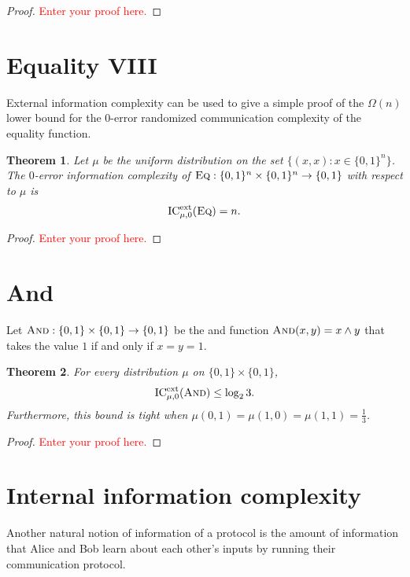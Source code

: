 \documentclass[11pt]{amsart}
\theoremstyle{plain}
\newtheorem{theorem}{Theorem}
\theoremstyle{definition}
\theoremstyle{plain}
\newcommand{\Eq}{\textsc{Eq}}
\newcommand{\ICext}{\mathrm{IC}^{\mathrm{ext}}}
\newcommand{\replacethistext}[1]{\textcolor{red}{#1}}
\begin{document}
\begin{proof}
\replacethistext{Enter your proof here.}
\end{proof}


\newpage 
\section{Equality VIII}

External information complexity can be used to give a simple proof of the $\Omega(n)$ lower bound for the $0$-error randomized communication complexity of the equality function.

\begin{theorem}
Let $\mu$ be the uniform distribution on the set $\{(x,x) : x \in \{0,1\}^n\}$. The $0$-error information complexity of $\Eq : \{0,1\}^n \times \{0,1\}^n \to \{0,1\}$ with respect to $\mu$ is
\[
\ICext_{\mu,0}(\Eq) = n.
\]
\end{theorem}

\begin{proof}
\replacethistext{Enter your proof here.}
\end{proof}

\newpage 
\section{And}

Let $\textsc{And} : \{0,1\} \times \{0,1\} \to \{0,1\}$ be the and function $\textsc{And}(x,y) = x \wedge y$ that takes the value $1$ if and only if $x = y = 1$.

\begin{theorem}
For every distribution $\mu$ on $\{0,1\} \times \{0,1\}$,
\[
\ICext_{\mu,0}(\textsc{And}) \le \log_2 3.
\]
Furthermore, this bound is tight when $\mu(0,1) = \mu(1,0) = \mu(1,1) = \frac13$.
\end{theorem}

\begin{proof}
\replacethistext{Enter your proof here.}
\end{proof}


\newpage 
\section{Internal information complexity}

Another natural notion of information of a protocol is the amount of information that Alice and Bob learn about each other's inputs by running their communication protocol.
\end{document}
